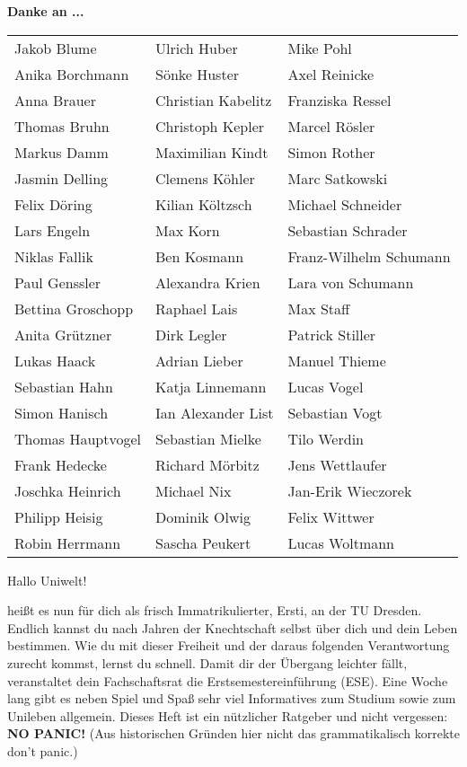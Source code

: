 \textbf{Danke an ...}
\\

\begin{tabular}{l l l} 

Jakob Blume & Ulrich Huber & Mike Pohl\\
Anika Borchmann & Sönke Huster & Axel Reinicke\\
Anna Brauer & Christian Kabelitz & Franziska Ressel\\
Thomas Bruhn & Christoph Kepler& Marcel Rösler\\
Markus Damm & Maximilian Kindt & Simon Rother\\
Jasmin Delling & Clemens Köhler & Marc Satkowski\\
Felix Döring & Kilian Költzsch & Michael Schneider\\
Lars Engeln & Max Korn & Sebastian Schrader\\
Niklas Fallik & Ben Kosmann & Franz-Wilhelm Schumann\\
Paul Genssler & Alexandra Krien & Lara von Schumann\\
Bettina Groschopp & Raphael Lais & Max Staff\\
Anita Grützner & Dirk Legler & Patrick Stiller\\
Lukas Haack & Adrian Lieber & Manuel Thieme\\
Sebastian Hahn & Katja Linnemann & Lucas Vogel\\
Simon Hanisch & Ian Alexander List & Sebastian Vogt\\
Thomas Hauptvogel & Sebastian Mielke & Tilo Werdin\\
Frank Hedecke & Richard Mörbitz & Jens Wettlaufer\\
Joschka Heinrich & Michael Nix & Jan-Erik Wieczorek\\
Philipp Heisig & Dominik Olwig & Felix Wittwer\\
Robin Herrmann & Sascha Peukert & Lucas Woltmann\\

\end{tabular}


Hallo Uniwelt!

heißt es nun für dich als frisch Immatrikulierter, Ersti, an der TU Dresden. 
Endlich kannst du nach Jahren der Knechtschaft selbst über dich und dein Leben bestimmen. 
Wie du mit dieser Freiheit und der daraus folgenden Verantwortung zurecht kommst, lernst du schnell. 
Damit dir der Übergang leichter fällt, veranstaltet dein Fachschaftsrat die Erstsemestereinführung (ESE). 
Eine Woche lang gibt es neben Spiel und Spaß sehr viel Informatives zum Studium sowie zum Unileben allgemein. 
Dieses Heft ist ein nützlicher Ratgeber und nicht vergessen: 
\textbf{NO PANIC!} (Aus historischen Gründen hier nicht das grammatikalisch korrekte \glqq don't panic\grqq.)


